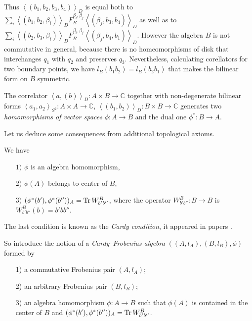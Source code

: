 \documentclass[pdftex]{sigma}
\newcommand{\tr}{\mathop{\sf tr}\nolimits}
\def \tr {{\rm Tr}\,}
\def \lc {\left<}
\def \rc {\right>}
\begin{document}
Thus $\lc (b_1,b_2,b_3,b_4) \rc_{D}$ is equal both to
$\sum_{i}\lc (b_1,b_2,\beta_i) \rc_{D}F_B^{\beta_i,\beta_j} \lc(\beta_j,b_3,b_4)\rc_{D}$
as well as to
$\sum_{i} \lc (b_2,b_3,\beta_i)\rc_{D}F_B^{\beta_i,\beta_j} \lc (\beta_j,b_4,b_1) \rc_{D}$.
However the algebra $B$ is not commutative in general,
because there is no homeomorphisms of disk that interchanges
$q_1$ with $q_2$ and preserves $q_3$. Nevertheless, calculating corellators for
two boundary points, we have
$l_B(b_1 b_2) = l_B(b_2 b_1)$ that makes the bilinear form on $B$ symmetric.

The correlator $\lc a,(b) \rc_D: A\times B\rightarrow\mathbb{C}$ together with
non-degenerate bilinear forms $\lc a_1,a_2 \rc_{S^2}: A\times
A\rightarrow\mathbb{C}$, $\lc (b_1,b_2) \rc_D: B\times
B\rightarrow\mathbb{C}$ generates two \textit{homomorphisms of vector
spaces} $\phi: A\rightarrow B$ and the dual one $\phi^*: B\rightarrow A$.

Let us deduce some consequences from additional topological axioms.

\begin{proposition}
We have
\begin{enumerate}\itemsep=0pt
\item[$1)$] $\phi$ is an algebra homomorphism,

\item[$2)$] $\phi(A)$ belongs to center of $B$,

\item[$3)$] $(\phi^*(b'),\phi^*(b''))_A=\tr W^B_{b'b''}$, where the
operator $W^B_{b'b''}:B\rightarrow B$ is $W^B_{b'b''}(b)=b'bb''$.
\end{enumerate}
\end{proposition}


The last condition  is known as
the \textit{Cardy condition}, it
appeared in papers  \cite{C1,C2}.


So introduce the notion of a
\textit{Cardy--Frobenius algebra} $((A,l_A),(B,l_B),\phi)$ formed by
\begin{enumerate}\itemsep=0pt
\item[1)] a commutative Frobenius pair $(A,l_A)$;

\item[2)] an arbitrary Frobenius pair $(B,l_B)$;

\item[3)] an algebra homomorphism $\phi: A\rightarrow B$ such that $\phi(A)$
is contained in the center of $B$ and
$(\phi^*(b'),\phi^*(b''))_A=\tr W^B_{b'b''}$.
\end{enumerate}
\end{document}
